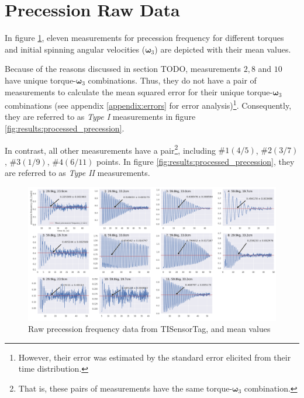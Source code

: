 \section{Precession Raw Data} \label{sec:appendix:precession_raw_data}
In figure \ref{fig:appendix:raw_precession_data}, eleven measurements for precession frequency for different torques and initial spinning angular velocities ($\boldsymbol\omega_{3}$) are depicted with their mean values.

Because of the reasons discussed in section TODO, measurements $2, 8$ and $10$ have unique torque-$\boldsymbol\omega_3$ combinations. Thus, they do not have a pair of measurements to calculate the mean squared error for their unique torque-$\boldsymbol\omega_3$ combinations (see appendix \ref{appendix:errors} for error analysis)\footnote{However, their error was estimated by the standard error elicited from their time distribution.}. Consequently, they are referred to as \emph{Type I} measurements in figure \ref{fig:results:processed_precession}.

In contrast, all other measurements have a pair\footnote{That is, these pairs of measurements have the same torque-$\boldsymbol\omega_3$ combination.}, including $\#1 (4/5)$, $\#2 (3/7)$, $\#3 (1/9)$, $\#4 (6/11)$ points. In figure \ref{fig:results:processed_precession}, they are referred to as \emph{Type II} measurements.

\begin{figure}[!ht]
  \centering
  \includegraphics[width=\textwidth]{gyroscope/images/raw_precession}
  \caption{Raw precession frequency data from TISensorTag, and mean values}
  \label{fig:appendix:raw_precession_data}
\end{figure}

